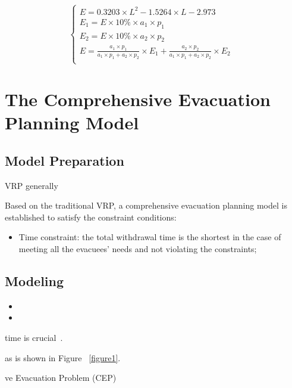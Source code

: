 \documentclass{mcmthesis}
\begin{document}
\begin{equation}
\left\{
\begin{array}{lr}
E= 0.3203\times L^2 -1.5264\times L -  2.973&\\
E_1=E \times 10\% \times a_1 \times p_1 &\\
E_2=E\times 10\% \times a_2 \times p_2 &\\
E= \frac{a_1 \times p_1}{a_1 \times p_1+ a_2 \times p_2} \times E_1 + \frac{a_2 \times p_2}{a_1 \times p_1+ a_2 \times p_2} \times E_2\\

\end{array}
\right.
\end{equation}



\section{The Comprehensive Evacuation Planning Model}
\subsection{Model Preparation}


VRP \cite{Dikas2016Solving,He2015Model} generally 


Based on the traditional VRP, a comprehensive evacuation planning model is established to satisfy the constraint conditions:

\begin{itemize}
  \item Time constraint: the total withdrawal time is the shortest in the case of meeting all the evacuees' needs and not violating the constraints;
\end{itemize}

\subsection{Modeling}

\begin{itemize}

\item 
\item 
\end{itemize}

time is crucial~\cite{Sayyady2010Optimizing,So2010Managing}.



as is shown in Figure ~\ref{figure1}.

ve Evacuation Problem (CEP)\cite{Murray2013Evacuation,Ng2015Sharp,Ng2010Reliable}
\end{document}
